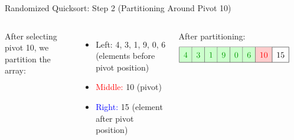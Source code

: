 \begin{frame}{Randomized Quicksort: Step 2 (Partitioning Around Pivot 10)}
  \begin{columns}[t]
    After selecting pivot 10, we partition the array:
    \begin{itemize}
      \item \textcolor{green!60!black}{Left:} 4, 3, 1, 9, 0, 6 (elements before pivot position)
      \item \textcolor{red}{Middle:} 10 (pivot)
      \item \textcolor{blue}{Right:} 15 (element after pivot position)
    \end{itemize}

    After partitioning:
    \[
      \renewcommand{\arraystretch}{1.5}
      \begin{array}{|c|c|c|c|c|c|c|c|}
        \hline
        \cellcolor{green!20}\textcolor{green!60!black}{4} & \cellcolor{green!20}\textcolor{green!60!black}{3} & \cellcolor{green!20}\textcolor{green!60!black}{1} & \cellcolor{green!20}\textcolor{green!60!black}{9} & \cellcolor{green!20}\textcolor{green!60!black}{0} & \cellcolor{green!20}\textcolor{green!60!black}{6} & \cellcolor{red!20}\textcolor{red}{10} & 15 \\
        \hline
      \end{array}
    \]

    \begin{minipage}[t]{\linewidth}
      \vspace{0pt}
      \begin{center}
      \end{center}
    \end{minipage}
  \end{columns}
\end{frame}

